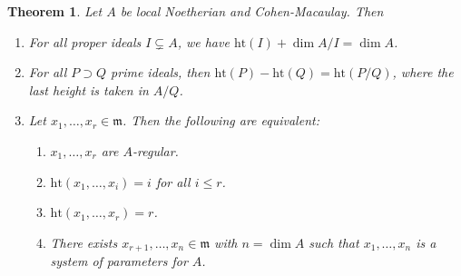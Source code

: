 \documentclass[leqno, openany]{memoir}
\newtheorem{thm}{Theorem}[section]
\theoremstyle{definition}
\theoremstyle{remark}
\theoremstyle{plain}
\theoremstyle{definition}
\theoremstyle{remark}
\newcommand{\mf}[1]{\mathfrak{#1}}
\newcommand{\mr}[1]{\mathrm{#1}}
\begin{document}
\begin{thm}
    Let $A$ be local Noetherian and Cohen-Macaulay. Then
    \begin{enumerate}
        \item For all proper ideals $I \subsetneq A$, we have $\mr{ht}(I) + \dim A/I = \dim A$.
        \item For all $P \supset Q$ prime ideals, then $\mr{ht}(P) - \mr{ht}(Q) = \mr{ht}(P/Q)$, where the last height is taken in $A/Q$.
        \item Let $x_1, \ldots, x_r \in \mf{m}$. Then the following are equivalent:
            \begin{enumerate}
                \item $x_1, \ldots, x_r$ are $A$-regular.
                \item $\mr{ht}(x_1, \ldots, x_i) = i$ for all $i \leq r$.
                \item $\mr{ht}(x_1, \ldots, x_r) = r$.
                \item There exists $x_{r+1}, \ldots, x_n \in \mf{m}$ with $n = \dim A$ such that $x_1, \ldots, x_n$ is a system of parameters for $A$.
            \end{enumerate}
    \end{enumerate}
\end{thm}
\end{document}
